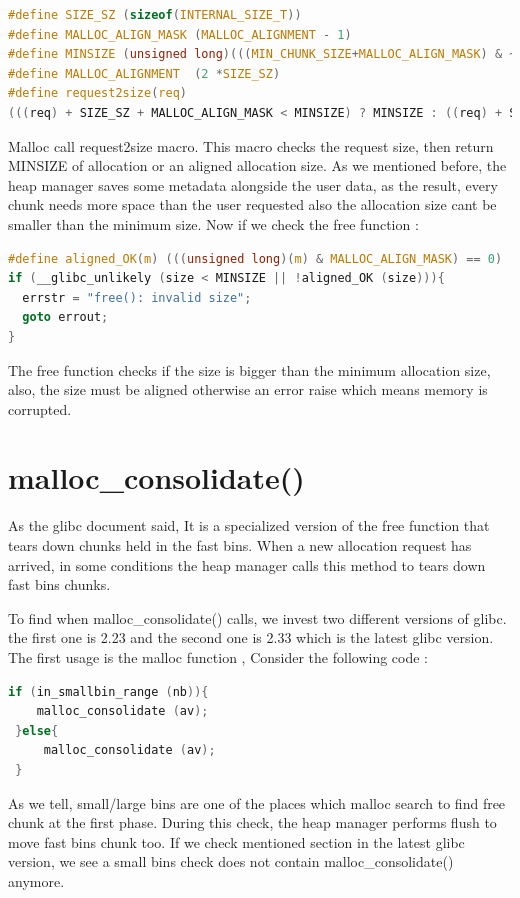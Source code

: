 \documentclass{masterthesis}
\newcommand*\libc{glibc}
\newcommand*\fb{fast bins}
\newcommand*\lb{large bins}
\newcommand*\sbs{small bins}
\begin{document}
\begin{lstlisting}[language=c,frame=tlrb]
#define SIZE_SZ (sizeof(INTERNAL_SIZE_T))
#define MALLOC_ALIGN_MASK (MALLOC_ALIGNMENT - 1)
#define MINSIZE (unsigned long)(((MIN_CHUNK_SIZE+MALLOC_ALIGN_MASK) & ~MALLOC_ALIGN_MASK))
#define MALLOC_ALIGNMENT  (2 *SIZE_SZ)
#define request2size(req)
(((req) + SIZE_SZ + MALLOC_ALIGN_MASK < MINSIZE) ? MINSIZE : ((req) + SIZE_SZ + MALLOC_ALIGN_MASK) & ~MALLOC_ALIGN_MASK)
\end{lstlisting}

Malloc call request2size macro. This macro checks the request size, then return MINSIZE of allocation or an aligned allocation size. As we mentioned before, the heap manager saves some metadata alongside the user data, as the result, every chunk needs more space than the user requested also the allocation size cant be smaller than the minimum size. Now if we check the free function :

\begin{lstlisting}[language=c,frame=tlrb]
#define aligned_OK(m) (((unsigned long)(m) & MALLOC_ALIGN_MASK) == 0)
if (__glibc_unlikely (size < MINSIZE || !aligned_OK (size))){
  errstr = "free(): invalid size";
  goto errout;
}
\end{lstlisting}

The free function checks if the size is bigger than the minimum allocation size, also, the size must be aligned otherwise an error raise which means memory is corrupted.

\section{malloc\_consolidate()}
As the \libc{} document said, It is a specialized version of the free function that tears down chunks held in the \fb{}. When a new allocation request has arrived, in some conditions the heap manager calls this method to tears down \fb{} chunks. 

To find when malloc\_consolidate() calls, we invest two different versions of \libc{}. the first one is 2.23 and the second one is 2.33 which is the latest \libc{} version. The first usage is the malloc function , Consider the following code :

\begin{lstlisting}[language=c,frame=tlrb]
 if (in_smallbin_range (nb)){
 	malloc_consolidate (av);
 }else{
	 malloc_consolidate (av);
 }
\end{lstlisting}

As we tell, small/\lb{} are one of the places which malloc search to find free chunk at the first phase. During this check, the heap manager performs flush to move \fb{} chunk too. If we check mentioned section in the latest \libc{} version, we see a \sbs{} check does not contain malloc\_consolidate() anymore.
\end{document}
